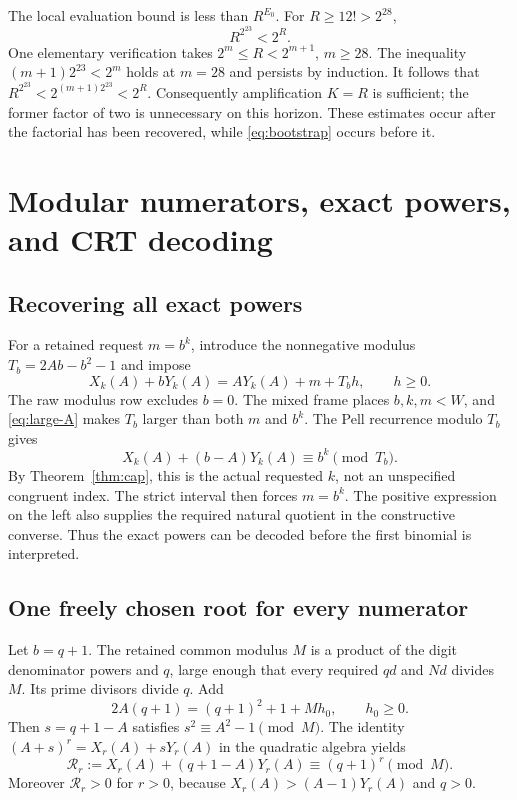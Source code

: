 \documentclass[11pt,letterpaper]{article}
\theoremstyle{remark}\newtheorem{remark}[theorem]{Remark}
\begin{document}
The local evaluation bound is less than $R^{E_0}$.  For $R\ge12!>2^{28}$,
\[
 R^{2^{23}}<2^R.
\]
One elementary verification takes $2^m\le R<2^{m+1}$, $m\ge28$.
The inequality $(m+1)2^{23}<2^m$ holds at $m=28$ and persists by induction.
It follows that $R^{2^{23}}<2^{(m+1)2^{23}}<2^R$.
Consequently amplification $K=R$ is sufficient; the former factor of two
is unnecessary on this horizon.  These estimates occur after the factorial
has been recovered, while \eqref{eq:bootstrap} occurs before it.

\section{Modular numerators, exact powers, and CRT decoding}

\subsection{Recovering all exact powers}

For a retained request $m=b^k$, introduce the nonnegative modulus
$T_b=2Ab-b^2-1$ and impose
\[
 X_k(A)+bY_k(A)=AY_k(A)+m+T_bh,\qquad h\ge0.
\]
The raw modulus row excludes $b=0$.  The mixed frame places $b,k,m<W$,
and \eqref{eq:large-A} makes $T_b$ larger than both $m$ and $b^k$.
The Pell recurrence modulo $T_b$ gives
\[
 X_k(A)+(b-A)Y_k(A)\equiv b^k\pmod{T_b}.
\]
By Theorem~\ref{thm:cap}, this is the actual requested $k$, not an
unspecified congruent index.  The strict interval then forces $m=b^k$.
The positive expression on the left also supplies the required natural
quotient in the constructive converse.  Thus the exact powers can be
decoded before the first binomial is interpreted.

\subsection{One freely chosen root for every numerator}

Let $b=q+1$.  The retained common modulus $M$ is a product of the digit
denominator powers and $q$, large enough that every required $qd$ and
$Nd$ divides $M$.  Its prime divisors divide $q$.  Add
\begin{equation}\label{eq:root}
 2A(q+1)=(q+1)^2+1+Mh_0,\qquad h_0\ge0.
\end{equation}
Then $s=q+1-A$ satisfies $s^2\equiv A^2-1\pmod M$.  The identity
$(A+s)^r=X_r(A)+sY_r(A)$ in the quadratic algebra yields
\begin{equation}\label{eq:residue}
 \mathcal R_r:=X_r(A)+(q+1-A)Y_r(A)
       \equiv(q+1)^r\pmod M.
\end{equation}
Moreover $\mathcal R_r>0$ for $r>0$, because
$X_r(A)>(A-1)Y_r(A)$ and $q>0$.
\end{document}
